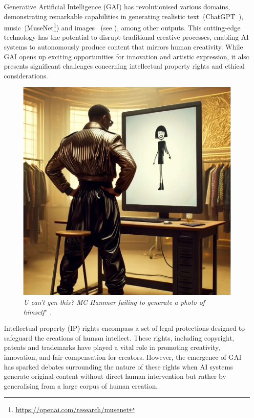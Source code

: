 \documentclass[conference,table]{IEEEtran}
\begin{document}
Generative Artificial Intelligence (GAI) has revolutionised various domains, demonstrating remarkable capabilities in generating realistic text~(ChatGPT~\cite{openai_gpt-4_2023}), music~(MuseNet\footnote{\url{https://openai.com/research/musenet}}) and images~\cite{rombach_high-resolution_2022,ramesh_hierarchical_2022} (see ), among other outputs.
This cutting-edge technology has the potential to disrupt traditional creative processes, enabling AI systems to autonomously produce content that mirrors human creativity. 
While GAI opens up exciting opportunities for innovation and artistic expression, it also presents significant challenges concerning intellectual property rights and ethical considerations.
\begin{figure}[ht]
    \centering
    \includegraphics[width=\linewidth]{mchammer-cantgenthis.PNG}
    \caption[]{\textit{U can't gen this? MC Hammer failing to generate a photo of himself}" 
    \footnotemark.
    } 
    \label{fig:introduction}
\end{figure}
Intellectual property (IP) rights encompass a set of legal protections designed to safeguard the creations of human intellect. These rights, including copyright, patents and trademarks have played a vital role in promoting creativity, innovation, and fair compensation for creators. However, the emergence of GAI has sparked debates surrounding the nature of these rights when AI systems generate original content without direct human intervention but rather by generalising from a large corpus of human creation.
\end{document}
